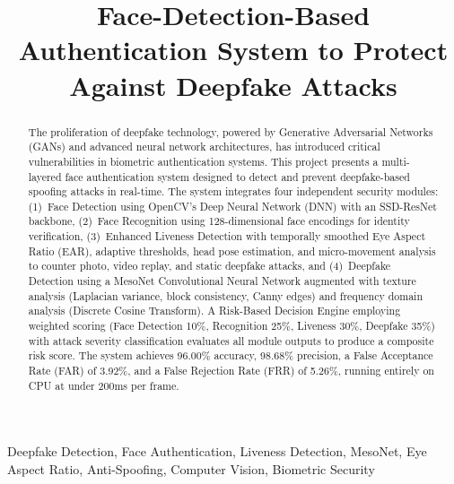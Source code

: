 \documentclass[conference,10pt]{IEEEtran}
\begin{document}
\title{Face-Detection-Based Authentication System to Protect Against Deepfake Attacks}

\author{
}

\maketitle


\begin{abstract}
The proliferation of deepfake technology, powered by Generative Adversarial Networks (GANs) and advanced neural network architectures, has introduced critical vulnerabilities in biometric authentication systems. This project presents a multi-layered face authentication system designed to detect and prevent deepfake-based spoofing attacks in real-time. The system integrates four independent security modules: (1)~Face Detection using OpenCV's Deep Neural Network (DNN) with an SSD-ResNet backbone, (2)~Face Recognition using 128-dimensional face encodings for identity verification, (3)~Enhanced Liveness Detection with temporally smoothed Eye Aspect Ratio (EAR), adaptive thresholds, head pose estimation, and micro-movement analysis to counter photo, video replay, and static deepfake attacks, and (4)~Deepfake Detection using a MesoNet Convolutional Neural Network augmented with texture analysis (Laplacian variance, block consistency, Canny edges) and frequency domain analysis (Discrete Cosine Transform). A Risk-Based Decision Engine employing weighted scoring (Face Detection 10\%, Recognition 25\%, Liveness 30\%, Deepfake 35\%) with attack severity classification evaluates all module outputs to produce a composite risk score. The system achieves 96.00\% accuracy, 98.68\% precision, a False Acceptance Rate (FAR) of 3.92\%, and a False Rejection Rate (FRR) of 5.26\%, running entirely on CPU at under 200ms per frame.
\end{abstract}

\begin{IEEEkeywords}
Deepfake Detection, Face Authentication, Liveness Detection, MesoNet, Eye Aspect Ratio, Anti-Spoofing, Computer Vision, Biometric Security
\end{IEEEkeywords}
\end{document}
